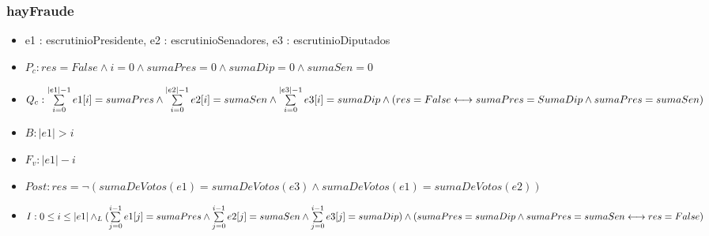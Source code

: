\documentclass[10pt,a4paper]{article}
\begin{document}
\subsubsection{hayFraude}
\begin{itemize}
        \item e1 : escrutinioPresidente, \: e2 : escrutinioSenadores, \: e3 : escrutinioDiputados
        \item $P_c : res=False \land i=0 \land sumaPres=0 \land sumaDip=0 \land sumaSen=0$
        
	\item $Q_c : \sum\limits_{i=0}^{|e1| - 1} e1[i] = sumaPres \land \sum\limits_{i=0}^{|e2| - 1} e2[i] = sumaSen \land \sum\limits_{i=0}^{|e3| - 1} e3[i] = sumaDip \land \\ 
 (res = False \longleftrightarrow sumaPres = SumaDip \land sumaPres = sumaSen)$
	\item $B : |e1| > i$
	\item $F_v : |e1| - i$
        \item $Post : res = \neg{(sumaDeVotos(e1) = sumaDeVotos(e3) \land sumaDeVotos(e1) = sumaDeVotos(e2))}$
	\item $I : 0 \leq i \leq |e1| \land_{L} (\sum\limits_{j=0}^{i - 1} e1[j] = sumaPres \land \sum\limits_{j=0}^{i - 1} e2[j] = sumaSen \land \sum\limits_{j=0}^{i - 1} e3[j] = sumaDip) \land \\
    (sumaPres = sumaDip  \land sumaPres = sumaSen \longleftrightarrow res = False)$
    
\end{itemize}
\vspace{6mm} 
\end{document}
